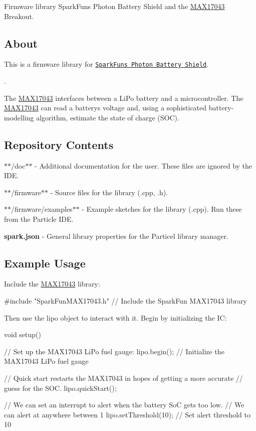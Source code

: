 Firmware library Spark\+Fun\textquotesingle{}s Photon Battery Shield and the \hyperlink{class_m_a_x17043}{M\+A\+X17043} Breakout.

\subsection*{About }

This is a firmware library for \href{https://www.sparkfun.com/products/13626}{\tt Spark\+Fun\textquotesingle{}s Photon Battery Shield}.

\href{https://www.sparkfun.com/products/13626}{\tt }.

The \hyperlink{class_m_a_x17043}{M\+A\+X17043} interfaces between a Li\+Po battery and a microcontroller. The \hyperlink{class_m_a_x17043}{M\+A\+X17043} can read a battery\textquotesingle{}s voltage and, using a sophisticated battery-\/modelling algorithm, estimate the state of charge (S\+OC).

\subsection*{Repository Contents }


\begin{DoxyItemize}
\item $\ast$$\ast$/doc$\ast$$\ast$ -\/ Additional documentation for the user. These files are ignored by the I\+DE.
\item $\ast$$\ast$/firmware$\ast$$\ast$ -\/ Source files for the library (.cpp, .h).
\item $\ast$$\ast$/firmware/examples$\ast$$\ast$ -\/ Example sketches for the library (.cpp). Run these from the Particle I\+DE.
\item {\bfseries spark.\+json} -\/ General library properties for the Particel library manager.
\end{DoxyItemize}

\subsection*{Example Usage }

Include the \hyperlink{class_m_a_x17043}{M\+A\+X17043} library\+: \begin{DoxyVerb}#include "SparkFunMAX17043.h" // Include the SparkFun MAX17043 library
\end{DoxyVerb}


Then use the {\ttfamily lipo} object to interact with it. Begin by initializing the IC\+: \begin{DoxyVerb}void setup()
{
    // Set up the MAX17043 LiPo fuel gauge:
    lipo.begin(); // Initialize the MAX17043 LiPo fuel gauge

    // Quick start restarts the MAX17043 in hopes of getting a more accurate
    // guess for the SOC.
    lipo.quickStart();

    // We can set an interrupt to alert when the battery SoC gets too low.
    // We can alert at anywhere between 1%
    lipo.setThreshold(10); // Set alert threshold to 10%
}
\end{DoxyVerb}


